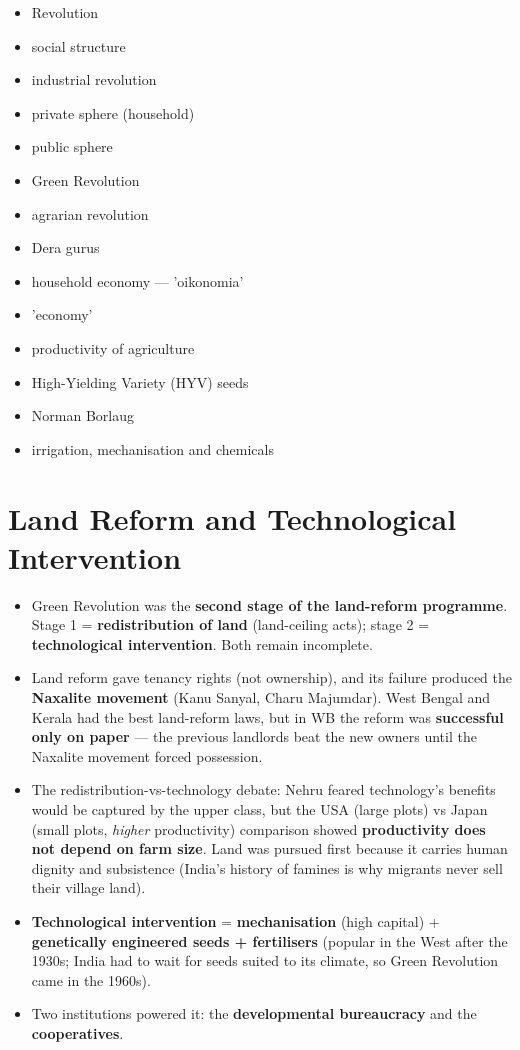 \begin{QuickRevision}
\begin{itemize}
\item Revolution
\item social structure
\item industrial revolution
\item private sphere (household)
\item public sphere
\item Green Revolution
\item agrarian revolution
\item Dera gurus
\item household economy --- 'oikonomia'
\item 'economy'
\item productivity of agriculture
\item High-Yielding Variety (HYV) seeds
\item Norman Borlaug
\item irrigation, mechanisation and chemicals
\end{itemize}
\end{QuickRevision}

\section{Land Reform and Technological Intervention}

\begin{KeyConcept}
\begin{itemize}
\item Green Revolution was the \textbf{second stage of the land-reform programme}. Stage 1 = \textbf{redistribution of land} (land-ceiling acts); stage 2 = \textbf{technological intervention}. Both remain incomplete.
\item Land reform gave tenancy rights (not ownership), and its failure produced the \textbf{Naxalite movement} (Kanu Sanyal, Charu Majumdar). West Bengal and Kerala had the best land-reform laws, but in WB the reform was \textbf{successful only on paper} --- the previous landlords beat the new owners until the Naxalite movement forced possession.
\item The redistribution-vs-technology debate: Nehru feared technology's benefits would be captured by the upper class, but the USA (large plots) vs Japan (small plots, \emph{higher} productivity) comparison showed \textbf{productivity does not depend on farm size}. Land was pursued first because it carries human dignity and subsistence (India's history of famines is why migrants never sell their village land).
\item \textbf{Technological intervention} = \textbf{mechanisation} (high capital) + \textbf{genetically engineered seeds + fertilisers} (popular in the West after the 1930s; India had to wait for seeds suited to its climate, so Green Revolution came in the 1960s).
\item Two institutions powered it: the \textbf{developmental bureaucracy} and the \textbf{cooperatives}.
\end{itemize}
\end{KeyConcept}

